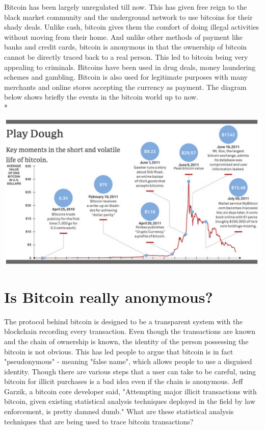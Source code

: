 Bitcoin has been largely unregulated till now. This has given free reign to the black market community and the underground network to use bitcoins for their shady deals. Unlike cash, bitcoin gives them the comfort of doing illegal activities without moving from their home. And unlike other methods of payment like banks and credit cards, bitcoin is anonymous in that the ownership of bitcoin cannot be directly traced back to a real person. This led to bitcoin being very appealing to criminals. Bitcoins have been used in drug deals, money laundering schemes and gambling. Bitcoin is also used for legitimate purposes with many merchants and online stores accepting the currency as payment. The diagram below shows briefly the events in the bitcoin world up to now.\\*

\includegraphics[scale=0.5]{images/life.png}

\section{Is Bitcoin really anonymous?}
The protocol behind bitcoin is designed to be a transparent system with the blockchain recording every transaction. Even though the transactions are known and the chain of ownership is known, the identity of the person possessing the bitcoin is not obvious. This has led people to argue that bitcoin is in fact  "pseudonymous" - meaning "false name", which allows people to use a disguised identity. Though there are various steps that a user can take to be careful, using bitcoin for illicit purchases is a bad idea even if the chain is anonymous. Jeff Garzik, a bitcoin core developer said, "Attempting major illicit transactions with bitcoin, given existing statistical analysis techniques deployed in the field by law enforcement, is pretty damned dumb."  What are these statistical analysis techniques that are being used to trace bitcoin transactions?

